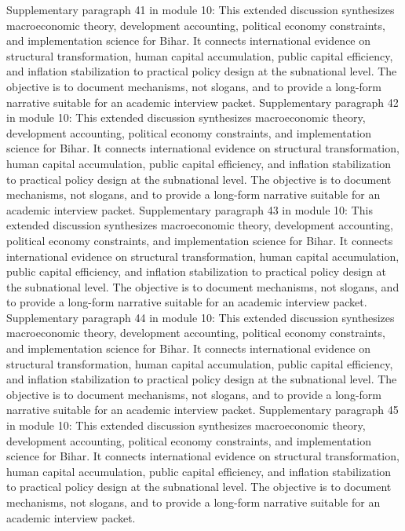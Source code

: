 \documentclass[preprint,12pt]{elsarticle}
\begin{document}
Supplementary paragraph 41 in module 10: This extended discussion synthesizes macroeconomic theory, development accounting, political economy constraints, and implementation science for Bihar. It connects international evidence on structural transformation, human capital accumulation, public capital efficiency, and inflation stabilization to practical policy design at the subnational level. The objective is to document mechanisms, not slogans, and to provide a long-form narrative suitable for an academic interview packet.
Supplementary paragraph 42 in module 10: This extended discussion synthesizes macroeconomic theory, development accounting, political economy constraints, and implementation science for Bihar. It connects international evidence on structural transformation, human capital accumulation, public capital efficiency, and inflation stabilization to practical policy design at the subnational level. The objective is to document mechanisms, not slogans, and to provide a long-form narrative suitable for an academic interview packet.
Supplementary paragraph 43 in module 10: This extended discussion synthesizes macroeconomic theory, development accounting, political economy constraints, and implementation science for Bihar. It connects international evidence on structural transformation, human capital accumulation, public capital efficiency, and inflation stabilization to practical policy design at the subnational level. The objective is to document mechanisms, not slogans, and to provide a long-form narrative suitable for an academic interview packet.
Supplementary paragraph 44 in module 10: This extended discussion synthesizes macroeconomic theory, development accounting, political economy constraints, and implementation science for Bihar. It connects international evidence on structural transformation, human capital accumulation, public capital efficiency, and inflation stabilization to practical policy design at the subnational level. The objective is to document mechanisms, not slogans, and to provide a long-form narrative suitable for an academic interview packet.
Supplementary paragraph 45 in module 10: This extended discussion synthesizes macroeconomic theory, development accounting, political economy constraints, and implementation science for Bihar. It connects international evidence on structural transformation, human capital accumulation, public capital efficiency, and inflation stabilization to practical policy design at the subnational level. The objective is to document mechanisms, not slogans, and to provide a long-form narrative suitable for an academic interview packet.
\end{document}

